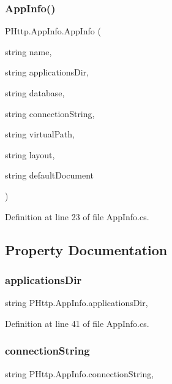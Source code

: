 \subsubsection{\texorpdfstring{App\+Info()}{AppInfo()}}
{\footnotesize\ttfamily P\+Http.\+App\+Info.\+App\+Info (\begin{DoxyParamCaption}\item[{string}]{name,  }\item[{string}]{applications\+Dir,  }\item[{string}]{database,  }\item[{string}]{connection\+String,  }\item[{string}]{virtual\+Path,  }\item[{string}]{layout,  }\item[{string}]{default\+Document }\end{DoxyParamCaption})}



Definition at line 23 of file App\+Info.\+cs.



\subsection{Property Documentation}
\mbox{\label{class_p_http_1_1_app_info_abc0623c7d5a48d5d0e68930da311a74f}} 
\subsubsection{\texorpdfstring{applications\+Dir}{applicationsDir}}
{\footnotesize\ttfamily string P\+Http.\+App\+Info.\+applications\+Dir\hspace{0.3cm}{\ttfamily [get]}, {\ttfamily [set]}}



Definition at line 41 of file App\+Info.\+cs.

\mbox{\label{class_p_http_1_1_app_info_ac319cff1fe0fbd1de94f3bd376122646}} 
\subsubsection{\texorpdfstring{connection\+String}{connectionString}}
{\footnotesize\ttfamily string P\+Http.\+App\+Info.\+connection\+String\hspace{0.3cm}{\ttfamily [get]}, {\ttfamily [set]}}



